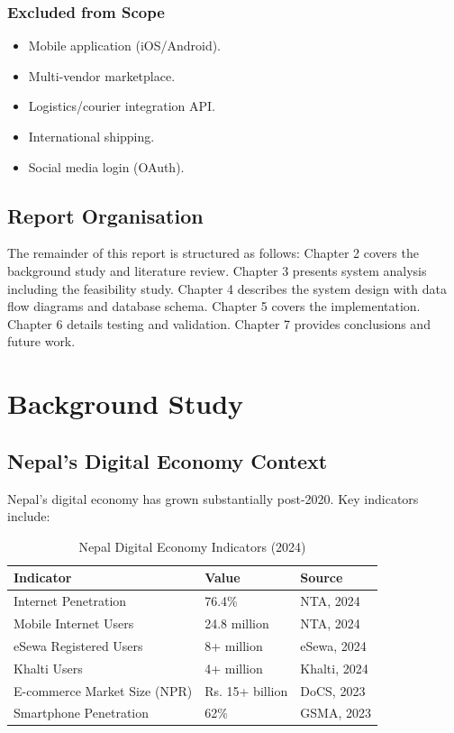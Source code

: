 \documentclass[12pt,a4paper]{report}
\begin{document}
\subsection{Excluded from Scope}
\begin{itemize}
  \item Mobile application (iOS/Android).
  \item Multi-vendor marketplace.
  \item Logistics/courier integration API.
  \item International shipping.
  \item Social media login (OAuth).
\end{itemize}

\section{Report Organisation}

The remainder of this report is structured as follows: Chapter 2 covers the background study and literature review. Chapter 3 presents system analysis including the feasibility study. Chapter 4 describes the system design with data flow diagrams and database schema. Chapter 5 covers the implementation. Chapter 6 details testing and validation. Chapter 7 provides conclusions and future work.

\chapter{Background Study}

\section{Nepal's Digital Economy Context}

Nepal's digital economy has grown substantially post-2020. Key indicators include:

\begin{table}[H]
\centering
\caption{Nepal Digital Economy Indicators (2024)}
\begin{tabular}{@{}lll@{}}
\toprule
\textbf{Indicator} & \textbf{Value} & \textbf{Source} \\
\midrule
Internet Penetration         & 76.4\%             & NTA, 2024 \\
Mobile Internet Users        & 24.8 million       & NTA, 2024 \\
eSewa Registered Users       & 8+ million         & eSewa, 2024 \\
Khalti Users                 & 4+ million         & Khalti, 2024 \\
E-commerce Market Size (NPR) & Rs. 15+ billion    & DoCS, 2023 \\
Smartphone Penetration       & 62\%               & GSMA, 2023 \\
\bottomrule
\end{tabular}
\end{table}
\end{document}
